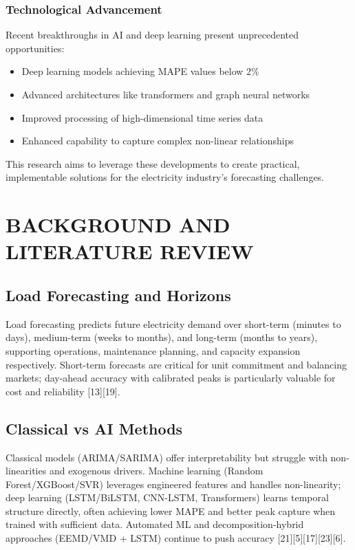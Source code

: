 \documentclass[12pt,a4paper]{report}
\begin{document}
\subsection{Technological Advancement}
Recent breakthroughs in AI and deep learning present unprecedented opportunities:
\begin{itemize}
\setlength{\itemsep}{0.2em}
\setlength{\parskip}{0pt}
\large
\item Deep learning models achieving MAPE values below 2\%
\item Advanced architectures like transformers and graph neural networks
\item Improved processing of high-dimensional time series data
\item Enhanced capability to capture complex non-linear relationships
\end{itemize}

This research aims to leverage these developments to create practical, implementable solutions for the electricity industry's forecasting challenges.


\chapter{BACKGROUND AND LITERATURE REVIEW}

\section{Load Forecasting and Horizons}
Load forecasting predicts future electricity demand over short-term (minutes to days), medium-term (weeks to months), and long-term (months to years), supporting operations, maintenance planning, and capacity expansion respectively. Short-term forecasts are critical for unit commitment and balancing markets; day-ahead accuracy with calibrated peaks is particularly valuable for cost and reliability [13][19].

\section{Classical vs AI Methods}
Classical models (ARIMA/SARIMA) offer interpretability but struggle with non-linearities and exogenous drivers. Machine learning (Random Forest/XGBoost/SVR) leverages engineered features and handles non-linearity; deep learning (LSTM/BiLSTM, CNN-LSTM, Transformers) learns temporal structure directly, often achieving lower MAPE and better peak capture when trained with sufficient data. Automated ML and decomposition-hybrid approaches (EEMD/VMD + LSTM) continue to push accuracy [21][5][17][23][6].
\end{document}
